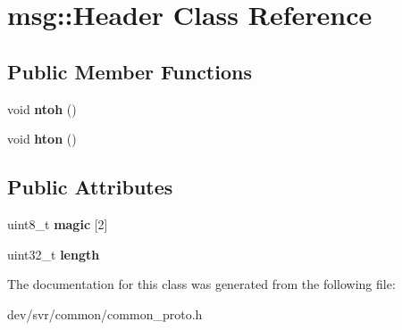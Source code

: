 \hypertarget{classmsg_1_1Header}{
\section{msg::Header Class Reference}
\label{classmsg_1_1Header}
}
\subsection*{Public Member Functions}
\begin{DoxyCompactItemize}
\item 
\hypertarget{classmsg_1_1Header_a963a8444c026ef4e91e4f27a909315ea}{
void {\bfseries ntoh} ()}
\label{classmsg_1_1Header_a963a8444c026ef4e91e4f27a909315ea}

\item 
\hypertarget{classmsg_1_1Header_a5311d5957a4d6cd07b48fd53f5975dc6}{
void {\bfseries hton} ()}
\label{classmsg_1_1Header_a5311d5957a4d6cd07b48fd53f5975dc6}

\end{DoxyCompactItemize}
\subsection*{Public Attributes}
\begin{DoxyCompactItemize}
\item 
\hypertarget{classmsg_1_1Header_a59e56aecbff914a3d65f8ea49885dde8}{
uint8\_\-t {\bfseries magic} \mbox{[}2\mbox{]}}
\label{classmsg_1_1Header_a59e56aecbff914a3d65f8ea49885dde8}

\item 
\hypertarget{classmsg_1_1Header_a4ce6ee4b8d3940a87b86a22c7c4a8537}{
uint32\_\-t {\bfseries length}}
\label{classmsg_1_1Header_a4ce6ee4b8d3940a87b86a22c7c4a8537}

\end{DoxyCompactItemize}


The documentation for this class was generated from the following file:\begin{DoxyCompactItemize}
\item 
dev/svr/common/common\_\-proto.h\end{DoxyCompactItemize}
